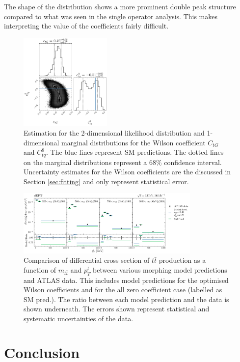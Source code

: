 \documentclass[a4paper,11pt]{article}
\begin{document}
The shape of the distribution shows a more prominent double peak structure compared to what was seen in the single operator analysis.
This makes interpreting the value of the coefficients fairly difficult. 

\begin{figure}[htb]
    \centering
    \includegraphics[width=0.4\textwidth]{plots/ATLAS-ctg-ctq8_2D_2OP.png}
    \caption{Estimation for the 2-dimensional likelihood distribution and 1-dimensional marginal distributions for the Wilson coefficient $C_{tG}$ and $C_{tq}^{8}$. The blue lines represent SM predictions. The dotted lines on the marginal distributions represent a 68\% confidence interval. Uncertainty estimates for the Wilson coefficients are the discussed in Section \ref{sec:fitting} and only represent statistical error.}
    \label{fig:corner_2D_2OP}
\end{figure}


\begin{figure}[htb]
    \centering
    \includegraphics[width=0.8\textwidth]{plots/ATLAS_model_result_2D_2OP.png}
    \caption{Comparison of differential cross section of $t\bar{t}$ production as a function of $m_{t\bar{t}}$ and $p_{T}^{t}$ between various morphing model predictions and ATLAS data. This includes model predictions for the optimised Wilson coefficients and for the all zero coefficient case (labelled as SM pred.). The ratio between each model prediction and the data is shown underneath. The errors shown represent statistical and systematic uncertainties of the data.}
    \label{fig:model_result_2D_2OP}
\end{figure}

\section{Conclusion}

\clearpage
\begingroup
\raggedright{}
\sloppy
\printbibliography{}
\endgroup
\end{document}
